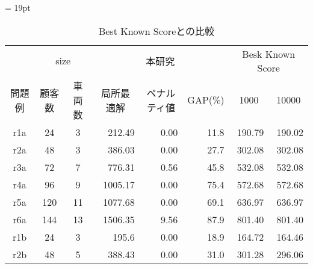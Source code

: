 \begin{landscape}
\begin{table}[]
\tabcolsep = 19pt
\renewcommand{\arraystretch}{0.8}
\caption{Best Known Scoreとの比較}
\label{cordeau}
\begin{tabular}{ccclllll}
\hline
        & \multicolumn{2}{c}{size}                    & \multicolumn{3}{c}{本研究}                                                        & \multicolumn{2}{c}{Besk Known Score}                       \\ \cline{2-8}
問題例     & 顧客数                    & 車両数                   & \multicolumn{1}{c}{局所最適解} & \multicolumn{1}{c}{ペナルティ値} & \multicolumn{1}{c}{GAP(\%)} & \multicolumn{1}{c}{1000} & \multicolumn{1}{c}{10000} \\ \cline{2-8}
r1a     & 24                   & 3                    & \multicolumn{1}{r}{212.49}    & \multicolumn{1}{r}{0.00}     & \multicolumn{1}{r}{11.8}   & \multicolumn{1}{r}{190.79}    & \multicolumn{1}{r}{190.02}     \\
r2a     & 48                   & 3                    & \multicolumn{1}{r}{386.03}    & \multicolumn{1}{r}{0.00}     & \multicolumn{1}{r}{27.7}   & \multicolumn{1}{r}{302.08}    & \multicolumn{1}{r}{302.08}     \\
r3a     & 72                   & 7                   & \multicolumn{1}{r}{776.31}    & \multicolumn{1}{r}{0.56}     & \multicolumn{1}{r}{45.8}   & \multicolumn{1}{r}{532.08}    & \multicolumn{1}{r}{532.08}     \\
r4a     & 96                   & 9                  & \multicolumn{1}{r}{1005.17}    & \multicolumn{1}{r}{0.00}     & \multicolumn{1}{r}{75.4}   & \multicolumn{1}{r}{572.68}    & \multicolumn{1}{r}{572.68}     \\
r5a     & 120                 & 11                   & \multicolumn{1}{r}{1077.68}    & \multicolumn{1}{r}{0.00}     & \multicolumn{1}{r}{69.1}   & \multicolumn{1}{r}{636.97}    & \multicolumn{1}{r}{636.97}     \\
r6a     & 144                  & 13                    & \multicolumn{1}{r}{1506.35}    & \multicolumn{1}{r}{9.56}     & \multicolumn{1}{r}{87.9}   & \multicolumn{1}{r}{801.40}    & \multicolumn{1}{r}{801.40}     \\
r1b    & 24                 & 3                    & \multicolumn{1}{r}{195.6}    & \multicolumn{1}{r}{0.00}     & \multicolumn{1}{r}{18.9}   & \multicolumn{1}{r}{164.72}    & \multicolumn{1}{r}{164.46}     \\
r2b     & 48                 & 5                  & \multicolumn{1}{r}{388.43}    & \multicolumn{1}{r}{0.00}     & \multicolumn{1}{r}{31.0}   & \multicolumn{1}{r}{301.28}    & \multicolumn{1}{r}{296.06}     \\

\end{tabular}
\end{table}
\end{landscape}
